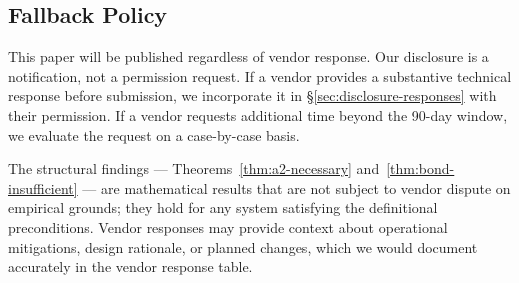 \subsection{Fallback Policy}
\label{sec:disclosure-fallback}

This paper will be published regardless of vendor response. Our disclosure
is a notification, not a permission request. If a vendor provides a
substantive technical response before submission, we incorporate it in
\S\ref{sec:disclosure-responses} with their permission. If a vendor
requests additional time beyond the 90-day window, we evaluate the request
on a case-by-case basis.

The structural findings --- Theorems~\ref{thm:a2-necessary}
and~\ref{thm:bond-insufficient} --- are mathematical results that are not
subject to vendor dispute on empirical grounds; they hold for any system
satisfying the definitional preconditions. Vendor responses may provide
context about operational mitigations, design rationale, or planned changes,
which we would document accurately in the vendor response table.
